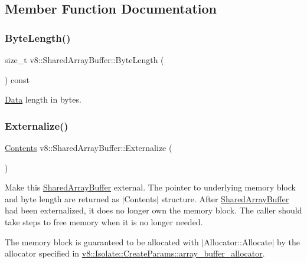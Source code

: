 \subsection{Member Function Documentation}
\mbox{\label{classv8_1_1SharedArrayBuffer_a746f2632ad6c2d80e8f2e5e6e5b77f94}} 
\subsubsection{\texorpdfstring{Byte\+Length()}{ByteLength()}}
{\footnotesize\ttfamily size\+\_\+t v8\+::\+Shared\+Array\+Buffer\+::\+Byte\+Length (\begin{DoxyParamCaption}{ }\end{DoxyParamCaption}) const}

\mbox{\hyperlink{classv8_1_1Data}{Data}} length in bytes. \mbox{\label{classv8_1_1SharedArrayBuffer_afe025bbf668e64439cfc0044b353eb41}} 
\subsubsection{\texorpdfstring{Externalize()}{Externalize()}}
{\footnotesize\ttfamily \mbox{\hyperlink{classv8_1_1SharedArrayBuffer_1_1Contents}{Contents}} v8\+::\+Shared\+Array\+Buffer\+::\+Externalize (\begin{DoxyParamCaption}{ }\end{DoxyParamCaption})}

Make this \mbox{\hyperlink{classv8_1_1SharedArrayBuffer}{Shared\+Array\+Buffer}} external. The pointer to underlying memory block and byte length are returned as $\vert$\+Contents$\vert$ structure. After \mbox{\hyperlink{classv8_1_1SharedArrayBuffer}{Shared\+Array\+Buffer}} had been externalized, it does no longer own the memory block. The caller should take steps to free memory when it is no longer needed.

The memory block is guaranteed to be allocated with $\vert$\+Allocator\+::\+Allocate$\vert$ by the allocator specified in \mbox{\hyperlink{structv8_1_1Isolate_1_1CreateParams_a7c663f70b64290392eeaf164f57585f9}{v8\+::\+Isolate\+::\+Create\+Params\+::array\+\_\+buffer\+\_\+allocator}}. \mbox{\label{classv8_1_1SharedArrayBuffer_af5a160b645c5c674450d9501697c2cf4}} 
